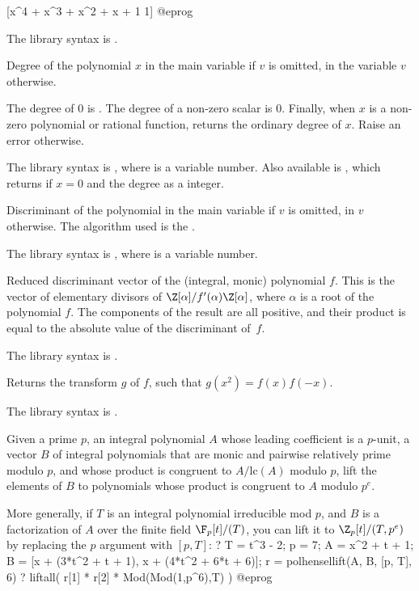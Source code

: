 [x^4 + x^3 + x^2 + x + 1 1]
@eprog

The library syntax is .

\label{se:poldegree}
Degree of the polynomial $x$ in the main variable if $v$ is omitted, in
the variable $v$ otherwise.

The degree of $0$ is . The degree of a non-zero scalar is $0$.
Finally, when $x$ is a non-zero polynomial or rational function, returns the
ordinary degree of $x$. Raise an error otherwise.

The library syntax is , where  is a variable number.
Also available is
, which returns  if $x = 0$
and the degree as a  integer.

\label{se:poldisc}
Discriminant of the polynomial
 in the main variable if $v$ is omitted, in $v$ otherwise. The
algorithm used is the .

The library syntax is , where  is a variable number.

\label{se:poldiscreduced}
Reduced discriminant vector of the
(integral, monic) polynomial $f$. This is the vector of elementary divisors
of $\Z[\alpha]/f'(\alpha)\Z[\alpha]$, where $\alpha$ is a root of the
polynomial $f$. The components of the result are all positive, and their
product is equal to the absolute value of the discriminant of~$f$.

The library syntax is .

\label{se:polgraeffe}
Returns the  transform $g$ of $f$, such that $g(x^2) = f(x)
f(-x)$.

The library syntax is .

\label{se:polhensellift}
Given a prime $p$, an integral polynomial $A$ whose leading coefficient
is a $p$-unit, a vector $B$ of integral polynomials that are monic and
pairwise relatively prime modulo $p$, and whose product is congruent to
$A/\text{lc}(A)$ modulo $p$, lift the elements of $B$ to polynomials whose
product is congruent to $A$ modulo $p^e$.

More generally, if $T$ is an integral polynomial irreducible mod $p$, and
$B$ is a factorization of $A$ over the finite field $\F_p[t]/(T)$, you can
lift it to $\Z_p[t]/(T, p^e)$ by replacing the $p$ argument with $[p,T]$:
\bprog
? { T = t^3 - 2; p = 7; A = x^2 + t + 1;
    B = [x + (3*t^2 + t + 1), x + (4*t^2 + 6*t + 6)];
    r = polhensellift(A, B, [p, T], 6) }
? liftall( r[1] * r[2] * Mod(Mod(1,p^6),T) )
@eprog


